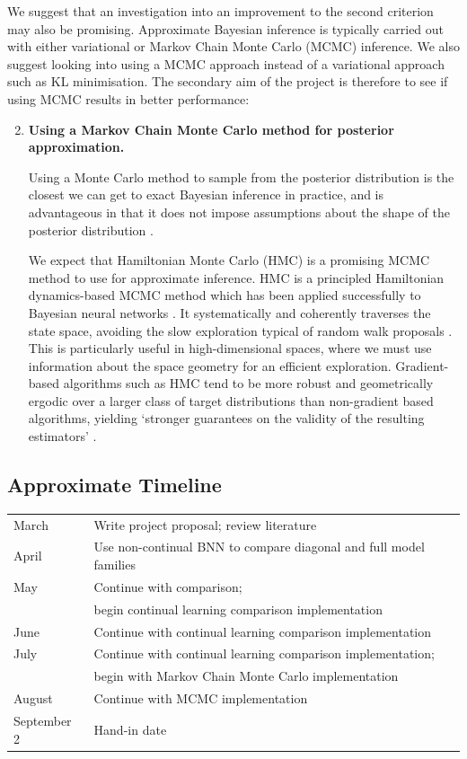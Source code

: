\documentclass[a4paper,11=0pt]{article}
\begin{document}
\vspace{0.5em}
We suggest that an investigation into an improvement to the second criterion may also be promising. Approximate Bayesian inference is typically carried out with either variational or Markov Chain Monte Carlo (MCMC) inference. We also suggest looking into using a MCMC approach instead of a variational approach such as KL minimisation. The secondary aim of the project is therefore to see if using MCMC results in better performance:
\begin{enumerate}
\setcounter{enumi}{1}
\item \textbf{Using a Markov Chain Monte Carlo method for posterior approximation.}

Using a Monte Carlo method to sample from the posterior distribution is the closest we can get to exact Bayesian inference in practice, and is advantageous in that it does not impose assumptions about the shape of the posterior distribution \cite{hinton}.

We expect that Hamiltonian Monte Carlo (HMC) is a promising MCMC method to use for approximate inference. HMC is a principled Hamiltonian dynamics-based MCMC method which has been applied successfully to Bayesian neural networks \cite{bayesianlearning}. It systematically and coherently traverses the state space, avoiding the slow exploration typical of random walk proposals \cite{hmc}. This is particularly useful in high-dimensional spaces, where we must use information about the space geometry for an efficient exploration. Gradient-based algorithms such as HMC tend to be more robust and geometrically ergodic over a larger class of target distributions than non-gradient based algorithms, yielding `stronger guarantees on the validity of the resulting estimators' \cite{conceptual}.
\end{enumerate}


\subsection*{Approximate Timeline}

\begin{tabular}{l|l}
\hline
March 	& Write project proposal; review literature\\
April	& Use non-continual BNN to compare diagonal and full model families\\
May		& Continue with comparison; \\
&begin continual learning comparison implementation \\
June 	& Continue with continual learning comparison implementation\\
July	& Continue with continual learning comparison implementation; \\
&begin with Markov Chain Monte Carlo implementation\\
August	& Continue with MCMC implementation\\
September 2 & Hand-in date\\
\hline
\end{tabular}
\end{document}
